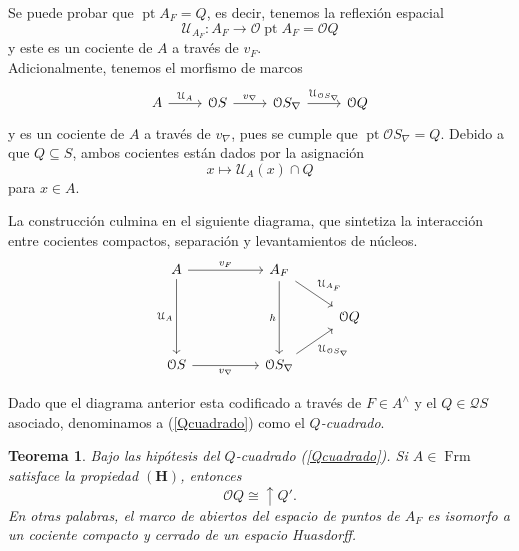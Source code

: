 \documentclass[11pt]{amsart}
\DeclareMathOperator{\pt}{pt}
\DeclareMathOperator{\Frm}{Frm}
\theoremstyle{plain}
\newtheorem{thm}{Teorema}[section]
\theoremstyle{definition}
\begin{document}
Se puede probar que $\pt A_F=Q$, es decir, tenemos la reflexión espacial
\[
\mathcal{U}_{A_F}\colon A_F\to \mathcal{O}\pt A_F=\mathcal{O}Q
\]
y este es un cociente de $A$ a través de $v_F$.\\ 

Adicionalmente, tenemos el morfismo de marcos
\[\begin{tikzcd}
	A & {\mathcal{O}S} & {\mathcal{O}S_\nabla} & {\mathcal{O}Q}
	\arrow["{\mathcal{U}_A}", from=1-1, to=1-2]
	\arrow["{v_\nabla}", from=1-2, to=1-3]
	\arrow["{\mathcal{U}_{\mathcal{O}S_\nabla}}", from=1-3, to=1-4]
\end{tikzcd}\]
y es un cociente de $A$ a través de $v_\nabla$, pues se cumple que $\pt \mathcal{O}S_\nabla=Q$. Debido a que $Q\subseteq S$, ambos cocientes están dados por la asignación
\[
x\mapsto \mathcal{U}_A(x)\cap Q
\]
para $x\in A$. 

La construcción culmina en el siguiente diagrama, que sintetiza la interacción entre cocientes compactos, separación y levantamientos de núcleos.
\begin{equation}\label{Qcuadrado}
\begin{tikzcd}
	A && {A_F} & \\
	&&& {\mathcal{O}Q} \\
	{\mathcal{O}S} && {\mathcal{O}S_\nabla}
	\arrow["{v_F}", from=1-1, to=1-3]
	\arrow["{\mathcal{U}_A}"', from=1-1, to=3-1]
	\arrow["{\mathcal{U}_{A_F}}", from=1-3, to=2-4]
	\arrow["h"', from=1-3, to=3-3]
	\arrow["{v_\nabla}"', from=3-1, to=3-3]
	\arrow["{\mathcal{U}_{\mathcal{O}S_\nabla}}"', from=3-3, to=2-4]
\end{tikzcd}\end{equation}

Dado que el diagrama anterior esta codificado a través de $F\in A^\wedge$ y el $Q\in \mathcal{Q}S$ asociado, 
denominamos a (\ref{Qcuadrado}) como el \emph{$Q$-cuadrado}.

\begin{thm}\label{haus1}
Bajo las hipótesis del $Q$-cuadrado (\ref{Qcuadrado}). Si $A\in \Frm$ satisface la propiedad $\mathbf{(H)}$, entonces
\[
\mathcal{O}Q\cong \uparrow Q'.
\]
En otras palabras, el marco de abiertos del espacio de puntos de $A_F$ es isomorfo a un cociente compacto
y cerrado de un espacio Huasdorff.
\end{thm}
\end{document}
